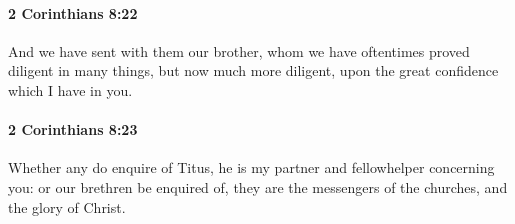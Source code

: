 		\paragraph{2 Corinthians 8:22} %
			\label{2CORINTHIANS-8-22}

			And we have sent with them our brother, whom we have oftentimes proved diligent in many things, but now much more diligent, upon the great confidence which I have in you.

			\begin{framed}
			\scriptsize
				\begin{compactdesc}
					\item[SBLG] 
				\end{compactdesc}
			\end{framed}

		\paragraph{2 Corinthians 8:23} %
			\label{2CORINTHIANS-8-23}

			Whether any do enquire of Titus, he is my partner and fellowhelper concerning you: or our brethren be enquired of, they are the messengers of the churches, and the glory of Christ.

